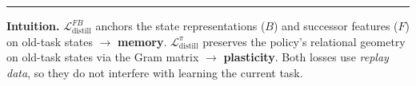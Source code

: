 \documentclass[11pt]{article}
\newcommand{\loss}{\mathcal{L}}
\begin{document}
\smallskip
\noindent\rule{\textwidth}{0.5pt}
\vspace{-0.3em}

\noindent\textbf{Intuition.}\;
$\loss_{\text{distill}}^{FB}$ anchors the state representations ($B$) and successor features ($F$) on old-task states $\to$ \textbf{memory}.
$\loss_{\text{distill}}^{\pi}$ preserves the policy's relational geometry on old-task states via the Gram matrix $\to$ \textbf{plasticity}.
Both losses use \emph{replay data}, so they do not interfere with learning the current task.
\end{document}
